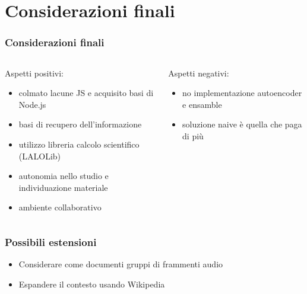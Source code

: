\documentclass{beamer}
\begin{document}
\section{Considerazioni finali}
\begin{frame}
	\frametitle{Considerazioni finali}


	\begin{columns}[T]
		\begin{column}{0.5\textwidth}
			Aspetti positivi:
			\begin{itemize}
				\item colmato lacune JS e acquisito basi di Node.js
				\item basi di recupero dell'informazione
				\item utilizzo libreria calcolo scientifico (LALOLib)
				\item autonomia nello studio e individuazione materiale
				\item ambiente collaborativo 
			\end{itemize}
		\end{column}
		
		\begin{column}{0.5\textwidth}
			Aspetti negativi:
	\begin{itemize}
		\item no implementazione autoencoder e ensamble
		\item soluzione naive è quella che paga di più
	\end{itemize}	
		\end{column}
	\end{columns}
\end{frame}

\begin{frame}
	\frametitle{Possibili estensioni}
	\begin{itemize}
		\item Considerare come documenti gruppi di frammenti audio
		\item Espandere il contesto usando Wikipedia
	\end{itemize}
	

\end{frame}

	

\end{document}
